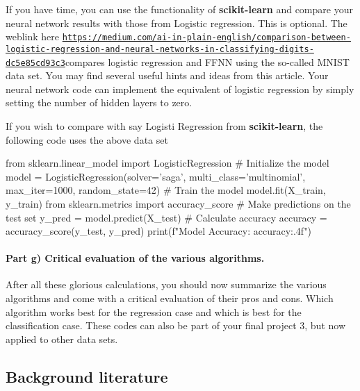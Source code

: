 \documentclass[%
oneside,                 %
final,                   %
10pt]{article}
\begin{document}
If you have time, you can use the functionality of \textbf{scikit-learn} and compare your neural network results with those from Logistic regression. This is optional.
The weblink  here \href{{https://medium.com/ai-in-plain-english/comparison-between-logistic-regression-and-neural-networks-in-classifying-digits-dc5e85cd93c3}}{\nolinkurl{https://medium.com/ai-in-plain-english/comparison-between-logistic-regression-and-neural-networks-in-classifying-digits-dc5e85cd93c3}}compares logistic regression and FFNN using the so-called MNIST data set. You may find several useful hints and ideas from this article. Your neural network code can implement the equivalent of logistic regression by simply setting the number of hidden layers to zero. 

If you wish to compare with say Logisti Regression from \textbf{scikit-learn}, the following code uses the above data set












\bpycod
from sklearn.linear_model import LogisticRegression
# Initialize the model
model = LogisticRegression(solver='saga', multi_class='multinomial', max_iter=1000, random_state=42)
# Train the model
model.fit(X_train, y_train)
from sklearn.metrics import accuracy_score
# Make predictions on the test set
y_pred = model.predict(X_test)
# Calculate accuracy
accuracy = accuracy_score(y_test, y_pred)
print(f"Model Accuracy: {accuracy:.4f}")

\epycod


\paragraph{Part g) Critical evaluation of the various algorithms.}
After all these glorious calculations, you should now summarize the
various algorithms and come with a critical evaluation of their pros
and cons. Which algorithm works best for the regression case and which
is best for the classification case. These codes can also be part of
your final project 3, but now applied to other data sets.

\subsection{Background literature}
\end{document}
